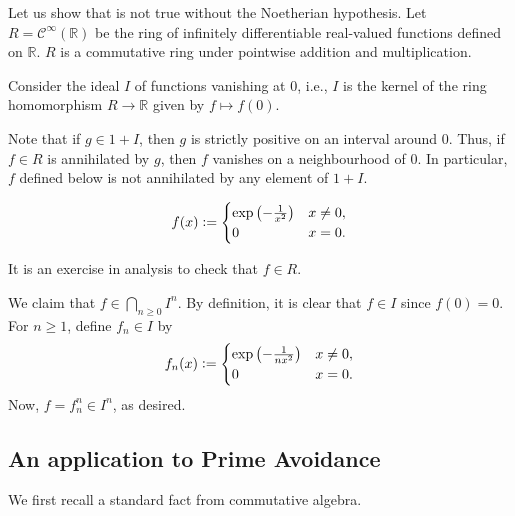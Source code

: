 \begin{ex}
	Let us show that  is not true without the Noetherian hypothesis. Let $R = \mathcal{C}^{\infty}(\mathbb{R})$ be the ring of infinitely differentiable real-valued functions defined on $\mathbb{R}$. $R$ is a commutative ring under pointwise addition and multiplication. 

	Consider the ideal $I$ of functions vanishing at $0$, i.e., $I$ is the kernel of the ring homomorphism $R \to \mathbb{R}$ given by $f \mapsto f(0)$. 

	Note that if $g \in 1 + I$, then $g$ is strictly positive on an interval around $0$. Thus, if $f \in R$ is annihilated by $g$, then $f$ vanishes on a neighbourhood of $0$. In particular, $f$ defined below is not annihilated by any element of $1 + I$.

	\begin{equation*} 
		f(x) \vcentcolon= 
		\begin{cases}
			\exp\left(-\frac{1}{x^{2}}\right) & x \neq 0, \\
			0 & x = 0.
		\end{cases}
	\end{equation*}

	It is an exercise in analysis to check that $f \in R$.

	We claim that $f \in \bigcap_{n \ge 0} I^{n}$. By definition, it is clear that $f \in I$ since $f(0) = 0$. For $n \ge 1$, define $f_{n} \in I$ by
	\begin{equation*} 
		f_{n}(x) \vcentcolon= 
		\begin{cases}
			\exp\left(-\frac{1}{n x^{2}}\right) & x \neq 0, \\
			0 & x = 0.
		\end{cases}
	\end{equation*}
	Now, $f = f_{n}^{n} \in I^{n}$, as desired.
\end{ex}

\subsection{An application to Prime Avoidance}

We first recall a standard fact from commutative algebra.

